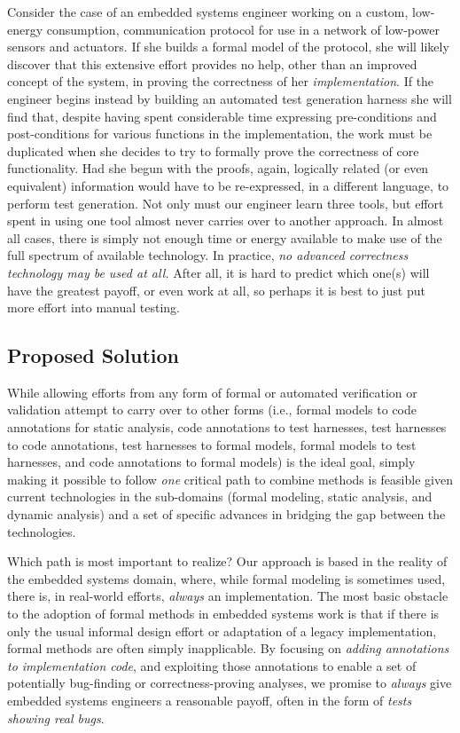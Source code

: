Consider the case of an embedded systems engineer working on a custom, low-energy consumption, communication protocol for use in a network of low-power sensors and actuators.  If she builds a formal model of the protocol, she will likely discover that this extensive effort provides no help, other than an improved concept of the system, in proving the correctness of her \emph{implementation}.  If the engineer begins instead by building an automated test generation harness she will find that, despite having spent considerable time expressing pre-conditions and post-conditions for various functions in the implementation, the work must be duplicated when she decides to try to formally prove the correctness of core functionality.  Had she begun with the proofs, again, logically related (or even equivalent) information would have to be re-expressed, in a different language, to perform test generation.  Not only must our engineer learn three tools, but effort spent in using one tool almost never carries over to another approach.  In almost all cases, there is simply not enough time or energy available to make use of the full spectrum of available technology.  In practice, \emph{no advanced correctness technology may be used at all.}  After all, it is hard to predict which one(s) will have the greatest payoff, or even work at all, so perhaps it is best to just put more effort into manual testing.

\subsection{Proposed Solution}

While allowing efforts from any form of formal or automated verification or validation attempt to carry over to other forms (i.e., formal models to code annotations for static analysis, code annotations to test harnesses, test harnesses to code annotations, test harnesses to formal models, formal models to test harnesses, and code annotations to formal models) is the ideal goal, simply making it possible to follow \emph{one} critical path to combine methods is feasible given current technologies in the sub-domains (formal modeling, static analysis, and dynamic analysis) and a set of specific advances in bridging the gap between the technologies.

Which path is most important to realize?  Our approach is based in the reality of the embedded systems domain, where, while formal modeling is sometimes used, there is, in real-world efforts, \emph{always} an implementation.  The most basic obstacle to the adoption of formal methods in embedded systems work is that if there is only the usual informal design effort or adaptation of a legacy implementation, formal methods are often simply inapplicable.  By focusing on \emph{adding annotations to implementation code}, and exploiting those annotations to enable a set of potentially bug-finding or correctness-proving analyses, we promise to \emph{always} give embedded systems engineers a reasonable payoff, often in the form of \emph{tests showing real bugs}.

